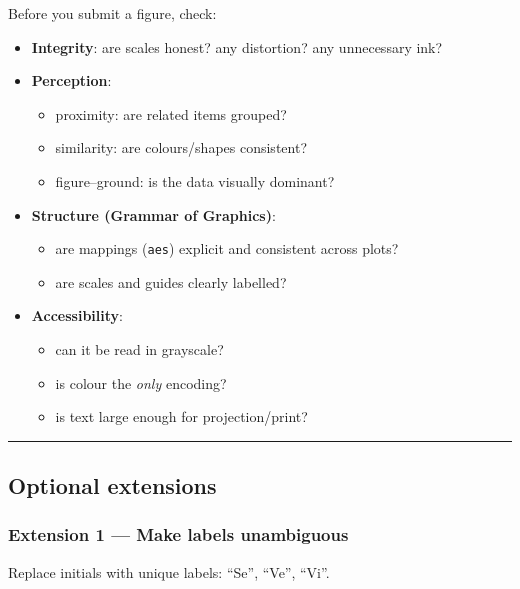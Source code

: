 \documentclass[
  letterpaper,
  DIV=11,
  numbers=noendperiod]{scrartcl}
\providecommand{\tightlist}{%
  \setlength{\itemsep}{0pt}\setlength{\parskip}{0pt}}\usepackage{longtable,booktabs,array}
\begin{document}
Before you submit a figure, check:

\begin{itemize}
\tightlist
\item
  \textbf{Integrity}: are scales honest? any distortion? any unnecessary
  ink?
\item
  \textbf{Perception}:

  \begin{itemize}
  \tightlist
  \item
    proximity: are related items grouped?
  \item
    similarity: are colours/shapes consistent?
  \item
    figure--ground: is the data visually dominant?
  \end{itemize}
\item
  \textbf{Structure (Grammar of Graphics)}:

  \begin{itemize}
  \tightlist
  \item
    are mappings (\texttt{aes}) explicit and consistent across plots?
  \item
    are scales and guides clearly labelled?
  \end{itemize}
\item
  \textbf{Accessibility}:

  \begin{itemize}
  \tightlist
  \item
    can it be read in grayscale?
  \item
    is colour the \emph{only} encoding?
  \item
    is text large enough for projection/print?
  \end{itemize}
\end{itemize}

\begin{center}\rule{0.5\linewidth}{0.5pt}\end{center}

\subsection{Optional extensions}\label{optional-extensions}

\subsubsection{Extension 1 --- Make labels
unambiguous}\label{extension-1-make-labels-unambiguous}

Replace initials with unique labels: ``Se'', ``Ve'', ``Vi''.
\end{document}
